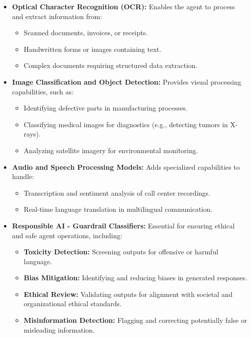 \documentclass[12pt]{article}
\begin{document}
\begin{itemize}
    \item \textbf{Optical Character Recognition (OCR):}  
    Enables the agent to process and extract information from:
    \begin{itemize}
        \item Scanned documents, invoices, or receipts.
        \item Handwritten forms or images containing text.
        \item Complex documents requiring structured data extraction.
    \end{itemize}

    \item \textbf{Image Classification and Object Detection:}  
    Provides visual processing capabilities, such as:
    \begin{itemize}
        \item Identifying defective parts in manufacturing processes.
        \item Classifying medical images for diagnostics (e.g., detecting tumors in X-rays).
        \item Analyzing satellite imagery for environmental monitoring.
    \end{itemize}

    \item \textbf{Audio and Speech Processing Models:}  
    Adds specialized capabilities to handle:
    \begin{itemize}
        \item Transcription and sentiment analysis of call center recordings.
        \item Real-time language translation in multilingual communication.
    \end{itemize}

    \item \textbf{Responsible AI - Guardrail Classifiers:}  
    Essential for ensuring ethical and safe agent operations, including:
    \begin{itemize}
        \item \textbf{Toxicity Detection:} Screening outputs for offensive or harmful language.
        \item \textbf{Bias Mitigation:} Identifying and reducing biases in generated responses.
        \item \textbf{Ethical Review:} Validating outputs for alignment with societal and organizational ethical standards.
        \item \textbf{Misinformation Detection:} Flagging and correcting potentially false or misleading information.
    \end{itemize}
\end{itemize}
\end{document}
